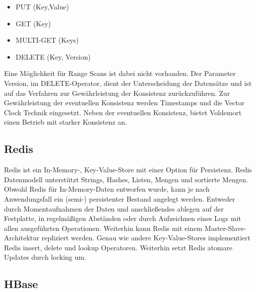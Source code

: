 \begin{itemize}

	\item PUT (Key,Value)
	\item GET (Key)
	\item MULTI-GET (Keys)
	\item DELETE (Key, Version) 

\end{itemize}

Eine Möglichkeit für Range Scans ist dabei nicht vorhanden. Der Parameter Version, im DELETE-Operator, dient der Unterscheidung der Datensätze und ist auf das Verfahren zur Gewährleistung der Konsistenz zurückzuführen. Zur Gewährleistung der eventuellen Konsistenz werden Timestamps und die Vector Clock Technik eingesetzt. Neben der eventuellen Konsistenz, bietet Voldemort einen Betrieb mit starker Konsistenz an.       

\subsection{Redis}
\label{ch:AnalyseDatenbanken:sec:Datenbanken:subsec:Redis}

Redis \cite{red2013} ist ein In-Memory-, Key-Value-Store mit einer Option für Persistenz. Redis Datenmodell unterstützt Strings, Hashes, Listen, Mengen und sortierte Mengen. Obwohl Redis für In-Memory-Daten entworfen wurde, kann je nach Anwendungsfall ein (semi-) persistenter Bestand angelegt werden. Entweder durch Momentaufnahmen der Daten und anschließendes ablegen auf der Festplatte, in regelmäßigen Abständen oder durch Aufzeichnen eines Logs mit allen ausgeführten Operationen. Weiterhin kann Redis mit einem Master-Slave-Architektur repliziert werden. Genau wie andere Key-Value-Stores implementiert Redis insert, delete und lookup Operatoren. Weiterhin setzt Redis atomare Updates durch locking um. 

\subsection{HBase} 
\label{ch:AnalyseDatenbanken:sec:Datenbanken:subsec:HBase}

